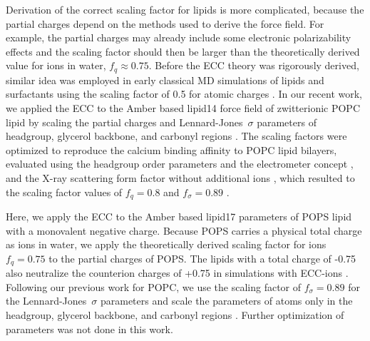 \documentclass[journal=jpcbfk,manuscript=article]{achemso}
\begin{document}
Derivation of the correct scaling factor for lipids is more complicated, because
the partial charges depend on the methods used to derive the force field.
For example, the partial charges may already include some electronic polarizability effects
and the scaling factor should then be larger than the theoretically derived value for ions in water, $f_q \approx 0.75$.
Before the ECC theory was rigorously derived, similar idea was employed in early classical 
MD simulations of lipids and surfactants using the scaling factor of 0.5 for atomic charges  \cite{jonsson86,egberts94, berendsen1996}. 
In our recent work, we applied the ECC to the Amber based lipid14 force field of zwitterionic POPC lipid \cite{dickson14}
by scaling the partial charges and Lennard-Jones~$\sigma$ parameters of headgroup, glycerol backbone,
and carbonyl regions \cite{melcr18}. The scaling factors were optimized to reproduce 
the calcium binding affinity to POPC lipid bilayers, evaluated using the headgroup order parameters
and the electrometer concept \cite{akutsu81,altenbach84,seelig87,catte16}, and the X-ray scattering form factor
without additional ions \cite{kucerka11}, which resulted to the scaling factor values of $f_q = 0.8$ and $f_\sigma = 0.89$  \cite{melcr18}.

Here, we apply the ECC to the Amber based lipid17 parameters \cite{lipid17-future} of POPS lipid with a monovalent negative charge.
Because POPS carries a physical total charge as ions in water, we apply the theoretically derived scaling factor for
ions $f_q = 0.75$ \cite{leontyev09} to the partial charges of POPS. The lipids with a total charge of -0.75 also neutralize
the counterion charges of +0.75 in simulations with ECC-ions \cite{kohagen16}.
Following our previous work for POPC, we use the scaling factor of $f_\sigma = 0.89$ for the Lennard-Jones~$\sigma$ parameters and
scale the parameters of atoms only in the headgroup, glycerol backbone, and carbonyl regions \cite{melcr18}.
Further optimization of parameters was not done in this work.


\end{document}
